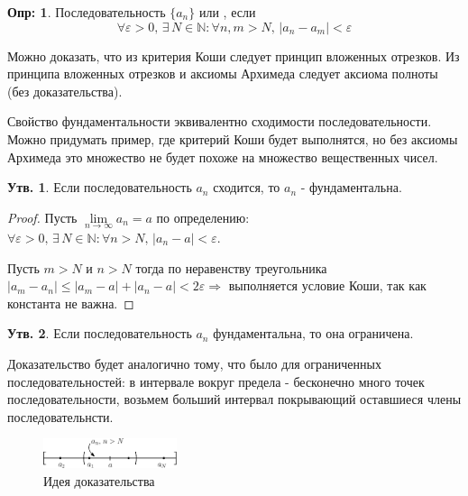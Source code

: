 \documentclass[12pt]{article}
\theoremstyle{definition}
\newtheorem{defn}{Опр:}
\newtheorem{prop}{Утв.}
\begin{document}


\begin{defn}
	Последовательность $\{a_n\}$  или , если $$\forall \varepsilon > 0,\, \exists \, N \in \mathbb{N} \colon \forall n, m > N, \, |a_n - a_m| < \varepsilon$$
\end{defn}

Можно доказать, что из критерия Коши следует принцип вложенных отрезков. Из принципа вложенных отрезков и аксиомы Архимеда следует аксиома полноты (без доказательства).

Свойство фундаментальности эквивалентно сходимости последовательности. Можно придумать пример, где критерий Коши будет выполнятся, но без аксиомы Архимеда это множество не будет похоже на множество вещественных чисел.

\begin{prop}
	Если последовательность $a_n$ сходится, то $a_n$ - фундаментальна.
\end{prop}

\begin{proof}
	Пусть $\lim\limits_{n\to \infty} a_n = a$ по определению: $\forall \varepsilon > 0,\, \exists \, N \in \mathbb{N} \colon \forall n > N, \, |a_n - a| < \varepsilon$.
	
	Пусть $m > N$ и $n > N$ тогда по неравенству треугольника $|a_m - a_n| \leq |a_m - a| + |a_n - a| < 2 \varepsilon \Rightarrow$ выполняется условие Коши, так как константа не важна.
\end{proof}

\begin{prop}
	Если последовательность $a_n$ фундаментальна, то она ограничена.
\end{prop}
Доказательство будет аналогично тому, что было для ограниченных последовательностей: в интервале вокруг предела - бесконечно много точек последовательности, возьмем больший интервал покрывающий оставшиеся члены последовательнсти.
\begin{figure}[H]
	\centering
	\includegraphics[width=0.35\textwidth]{10_1.eps}
	\caption{Идея доказательства}
	\label{10_1}
\end{figure}
\end{document}
